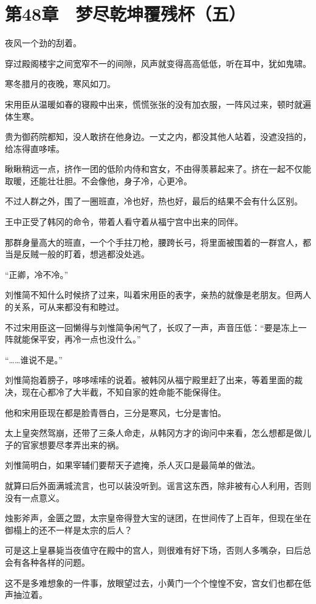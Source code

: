 \section{第48章　梦尽乾坤覆残杯（五）}

夜风一个劲的刮着。

穿过殿阁楼宇之间宽窄不一的间隙，风声就变得高高低低，听在耳中，犹如鬼啸。

寒冬腊月的夜晚，寒风如刀。

宋用臣从温暖如春的寝殿中出来，慌慌张张的没有加衣服，一阵风过来，顿时就遍体生寒。

贵为御药院都知，没人敢挤在他身边。一丈之内，都没其他人站着，没遮没挡的，给冻得直哆嗦。

瞅瞅稍远一点，挤作一团的低阶内侍和宫女，不由得羡慕起来了。挤在一起不仅能取暖，还能壮壮胆。不会像他，身子冷，心更冷。

不过人群之外，围了一圈班直，冷也好，热也好，最后的结果不会有什么区别。

王中正受了韩冈的命令，带着人看守着从福宁宫中出来的同伴。

那群身量高大的班直，一个个手拄刀枪，腰跨长弓，将里面被围着的一群宫人，都当是反贼一般的盯着，想逃都没处逃。

“正卿，冷不冷。”

刘惟简不知什么时候挤了过来，叫着宋用臣的表字，亲热的就像是老朋友。但两人的关系，可从来都没有和睦过。

不过宋用臣这一回懒得与刘惟简争闲气了，长叹了一声，声音压低：“要是冻上一阵就能保平安，再冷一点也没什么。”

“……谁说不是。”

刘惟简抱着膀子，哆哆嗦嗦的说着。被韩冈从福宁殿里赶了出来，等着里面的裁决，现在心都冷了大半截，不知自家的姓命能不能保得住。

他和宋用臣现在都是脸青唇白，三分是寒风，七分是害怕。

太上皇突然驾崩，还带了三条人命走，从韩冈方才的询问中来看，怎么想都是做儿子的官家想要尽孝弄出来的祸。

刘惟简明白，如果宰辅们要帮天子遮掩，杀人灭口是最简单的做法。

就算曰后外面满城流言，也可以装没听到。谣言这东西，除非被有心人利用，否则没有一点意义。

烛影斧声，金匮之盟，太宗皇帝得登大宝的谜团，在世间传了上百年，但现在坐在御榻上的还不一样是太宗的后人？

可是这上皇暴毙当夜值守在殿中的宫人，则很难有好下场，否则人多嘴杂，曰后总会有各种各样的问题。

这不是多难想象的一件事，放眼望过去，小黄门一个个惶惶不安，宫女们也都在低声抽泣着。

